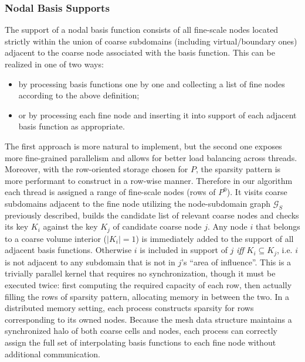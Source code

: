 \subsubsection{Nodal Basis Supports}
\label{subsubsec:par_kernels_support_nodes}

The support of a nodal basis function consists of all fine-scale nodes located strictly within the union of coarse subdomains (including virtual/boundary ones) adjacent to the coarse node associated with the basis function.   This can be realized in one of two ways:
\begin{itemize}
    \item by processing basis functions one by one and collecting a list of fine nodes according to the above definition;
    \item or by processing each fine node and inserting it into support of each adjacent basis function as appropriate.
\end{itemize}
The first approach is more natural to implement, but the second one exposes more fine-grained parallelism and allows for better load balancing across threads.   Moreover, with the row-oriented storage chosen for $P$, the sparsity pattern is more performant to construct in a row-wise manner.   Therefore in our algorithm each thread is assigned a range of fine-scale nodes (rows of $P^0$).   It visits coarse subdomains adjacent to the fine node utilizing the node-subdomain graph $\mathcal{G}_S$ previously described, builds the candidate list of relevant coarse nodes and checks its key $K_i$ against the key $K_j$ of candidate coarse node $j$.   Any node $i$ that belongs to a coarse volume interior ($|K_i| = 1$) is immediately added to the support of all adjacent basis functions.   Otherwise $i$ is included in support of $j$ \textit{iff} $K_i \subseteq K_j$, i.e. $i$ is not adjacent to any subdomain that is not in $j$'s ``area of influence''.   This is a trivially parallel kernel that requires no synchronization, though it must be executed twice: first computing the required capacity of each row, then actually filling the rows of sparsity pattern, allocating memory in between the two.   In a distributed memory setting, each process constructs sparsity for rows corresponding to its owned nodes.   Because the mesh data structure maintains a synchronized halo of both coarse cells and nodes, each process can correctly assign the full set of interpolating basis functions to each fine node without additional communication.

